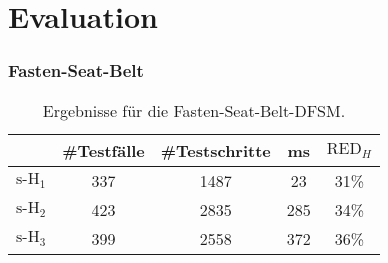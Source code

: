 \section{Evaluation}

\begin{frame}
  \frametitle{Fasten-Seat-Belt}
  \begin{table}[]
    \caption{Ergebnisse für die \glqq Fasten-Seat-Belt\grqq-DFSM.}
    \label{tab:fsbrtsx}
    \centering
    \begin{tabular}{|ccccc|}
    \hline
          & \#Testfälle & \#Testschritte & ms & $\text{RED}_H$\\ \hline\hline
        $\text{s-H}_1$ & 337         & 1487    &    23   &  31\% \\ \hline
    $\text{s-H}_2$ & 423         & 2835    &    285  & 34\%  \\ \hline
    $\text{s-H}_3$ & 399         & 2558    &    372   &  36\% \\ \hline
    \end{tabular}
\end{table}
\end{frame} 